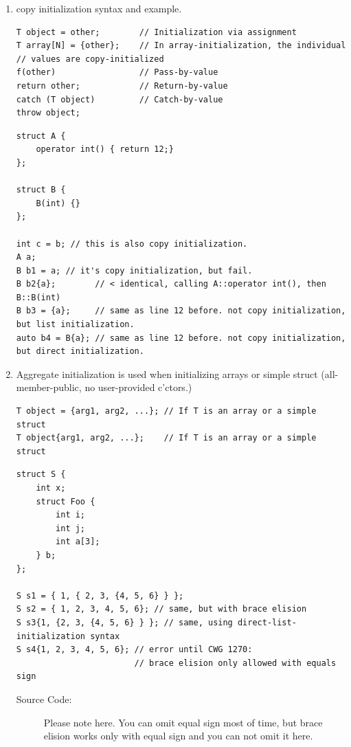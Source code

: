 \documentclass[a4paper,11pt,twoside]{book}
\begin{document}
\begin{itemize}
\begin{enumerate}
		\item copy initialization syntax and example.
\begin{lstlisting}[numbers=none]
T object = other;        // Initialization via assignment
T array[N] = {other};    // In array-initialization, the individual
// values are copy-initialized
f(other)                 // Pass-by-value
return other;            // Return-by-value
catch (T object)         // Catch-by-value
throw object;
\end{lstlisting}

\begin{lstlisting}[]
struct A {
	operator int() { return 12;}
};

struct B {
	B(int) {}
};

int c = b; // this is also copy initialization. 
A a;
B b1 = a; // it's copy initialization, but fail. 
B b2{a};        // < identical, calling A::operator int(), then B::B(int)
B b3 = {a};     // same as line 12 before. not copy initialization, but list initialization.
auto b4 = B{a}; // same as line 12 before. not copy initialization, but direct initialization.
\end{lstlisting}


		\item Aggregate initialization is used when initializing arrays or simple struct (all-member-public, no user-provided c'ctors.)
\begin{lstlisting}[numbers=none]
T object = {arg1, arg2, ...}; // If T is an array or a simple struct
T object{arg1, arg2, ...};    // If T is an array or a simple struct
\end{lstlisting}

\begin{lstlisting}[numbers=none]
struct S {
	int x;
	struct Foo {
		int i;
		int j;
		int a[3];
	} b;
};

S s1 = { 1, { 2, 3, {4, 5, 6} } };
S s2 = { 1, 2, 3, 4, 5, 6}; // same, but with brace elision
S s3{1, {2, 3, {4, 5, 6} } }; // same, using direct-list-initialization syntax
S s4{1, 2, 3, 4, 5, 6}; // error until CWG 1270: 
						// brace elision only allowed with equals sign
\end{lstlisting}

\begin{description}
	\item[Source Code:] Please note here. You can omit equal sign most of time,  but brace elision works only with equal sign and you can not omit it here.  
\end{description}


\end{enumerate}
\end{itemize}
\end{document}
